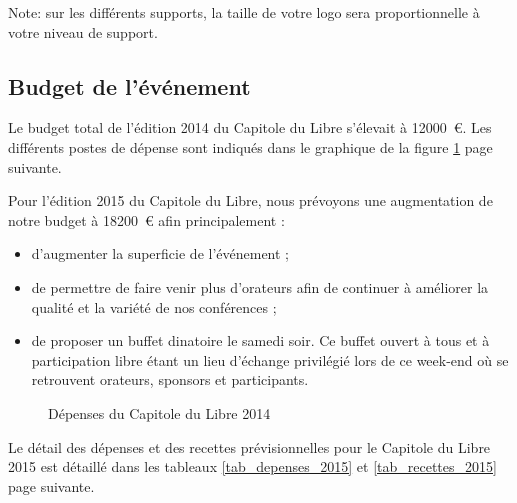 Note: sur les différents supports, la taille de votre logo sera proportionnelle à votre niveau de support.

	\subsection{Budget de l’événement}

Le budget total de l'édition 2014 du Capitole du Libre s'élevait à
 \SI{12000}{\euro}. Les différents postes de dépense sont indiqués dans
 le graphique de la figure \ref{fig_budget} page suivante.

Pour l'édition 2015 du Capitole du Libre, nous prévoyons une augmentation de notre budget à \SI{18200}{€} afin principalement :
\begin{itemize}[label=$\bullet$]
\item d'augmenter la superficie de l'événement ;
\item de permettre de faire venir plus d'orateurs afin de continuer à améliorer la qualité et la variété de nos conférences ;
\item de proposer un buffet dinatoire le samedi soir. Ce buffet ouvert à tous et à participation libre étant un lieu d'échange privilégié lors de ce week-end où se retrouvent orateurs, sponsors et participants.
\end{itemize}

\begin{figure}
\begin{center}
\end{center}
\caption{Dépenses du Capitole du Libre 2014}\label{fig_budget}
\end{figure}

\Separateur

Le détail des dépenses et des recettes prévisionnelles pour le Capitole du Libre 2015 est détaillé dans les tableaux \ref{tab_depenses_2015} et \ref{tab_recettes_2015} page suivante.

